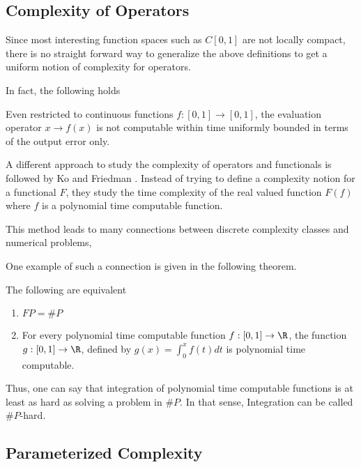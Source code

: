 	\subsection{Complexity of Operators}
		Since most interesting function spaces such as $C[0,1]$ are not locally compact,
		there is no straight forward way to generalize the above definitions to get
    a uniform notion of complexity for operators.

		In fact, the following holds
		\begin{theorem}
      Even restricted to continuous functions $f: [0,1] \to [0,1]$, the
      evaluation operator $x \to f(x)$ is not computable within time uniformly
      bounded in terms of the output error only.  
    \end{theorem}

	  A different approach to study the complexity of operators and functionals
    is followed by Ko and Friedman \cite{KoBook}.
    Instead of trying to define a complexity notion for a functional $F$, they
    study the time complexity of the real valued function $F(f)$ where $f$ is a
    polynomial time computable function.


		This  method leads to many connections between discrete complexity classes
    and numerical problems,

    One example of such a connection is given in the following theorem.
		\begin{theorem}
			The following are equivalent
			\begin{enumerate}
				\item $FP = \#P$
				\item For every polynomial time computable function $f: [0,1] \to \R$, the function
					$g: [0,1] \to \R$, defined by $g(x) = \int_0^x f(t) dt$ is polynomial time computable.
			\end{enumerate} 
		\end{theorem}
		Thus, one can say that integration of polynomial time computable functions is at
    least as hard as solving a problem in $\#P$.
    In that sense, Integration can be called $\#P$-hard.

 	\subsection{Parameterized Complexity}
